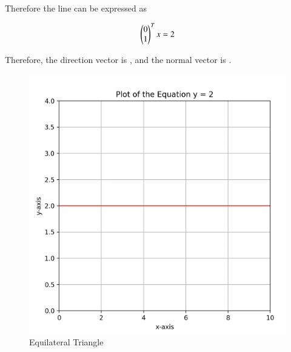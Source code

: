 \documentclass[12pt]{article}
\begin{document}
Therefore the line can be expressed as

\begin{align}
\begin{pmatrix}0\\1\end{pmatrix}^Tx=2
\end{align}

\vspace{1cm}


Therefore, the direction vector is  , and the normal vector is .



\begin{figure}[H]
    \centering
    \includegraphics[width=0.7\columnwidth]{Figs/Y=2.png}
    \caption{Equilateral Triangle}
    \label{fig:placeholder}
\end{figure}
\end{document}
